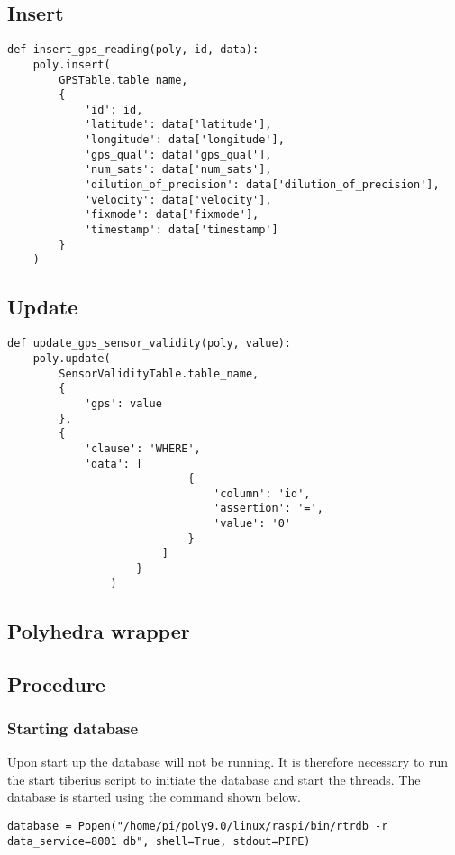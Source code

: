 \subsection{Insert}
\begin{lstlisting}
def insert_gps_reading(poly, id, data):
    poly.insert(
        GPSTable.table_name,
        {
            'id': id,
            'latitude': data['latitude'],
            'longitude': data['longitude'],
            'gps_qual': data['gps_qual'],
            'num_sats': data['num_sats'],
            'dilution_of_precision': data['dilution_of_precision'],
            'velocity': data['velocity'],
            'fixmode': data['fixmode'],
            'timestamp': data['timestamp']
        }
    )
\end{lstlisting}
\subsection{Update}
\begin{lstlisting}
def update_gps_sensor_validity(poly, value):
    poly.update(
        SensorValidityTable.table_name,
        {
            'gps': value
        },
        {
            'clause': 'WHERE',
            'data': [
                            {
                                'column': 'id',
                                'assertion': '=',
                                'value': '0'
                            }
                        ]
                    }
                )
\end{lstlisting}

\subsection{Polyhedra wrapper}





\subsection{Procedure}
\subsubsection{Starting database}
Upon start up the database will not be running. It is therefore necessary to run the start tiberius script to initiate the database and start the threads. The database is started using the command shown below.

\begin{lstlisting}
database = Popen("/home/pi/poly9.0/linux/raspi/bin/rtrdb -r data_service=8001 db", shell=True, stdout=PIPE)
\end{lstlisting}

